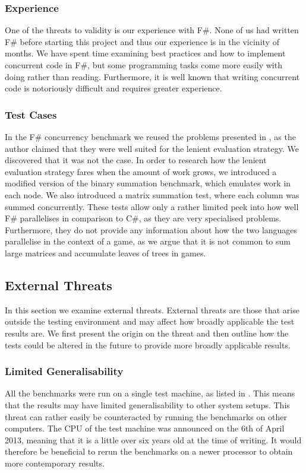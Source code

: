 \subsubsection{Experience}
One of the threats to validity is our experience with F\#. None of us had written F\# before starting this project and thus our experience is in the vicinity of months. We have spent time examining best practices and how to implement concurrent code in F\#, but some programming tasks come more easily with doing rather than reading. Furthermore, it is well known that writing concurrent code is notoriously difficult and requires greater experience\cite{nanz2013benchmarking,nanz2013examining}.

\subsubsection{Test Cases}
In the F\# concurrency benchmark we reused the problems presented in \cite{DBLP:journals/cl/Tremblay-parallel}, as the author claimed that they were well suited for the lenient evaluation strategy. We discovered that it was not the case. In order to research how the lenient evaluation strategy fares when the amount of work grows, we introduced a modified version of the binary summation benchmark, which emulates work in each node. We also introduced a matrix summation test, where each column was summed concurrently. These tests allow only a rather limited peek into how well F\# parallelises in comparison to C\#, as they are very specialised problems. Furthermore, they do not provide any information about how the two languages parallelise in the context of a game, as we argue that it is not common to sum large matrices and accumulate leaves of trees in games.

\subsection{External Threats}
In this section we examine external threats. External threats are those that arise outside the testing environment and may affect how broadly applicable the test results are. We first present the origin on the threat and then outline how the tests could be altered in the future to provide more broadly applicable results.

\subsubsection{Limited Generalisability}
All the benchmarks were run on a single test machine, as listed in . This means that the results may have limited generalisability to other system setups. This threat can rather easily be counteracted by running the benchmarks on other computers. The \gls{CPU} of the test machine was announced on the 6th of April 2013\cite{i7:specs}, meaning that it is a little over six years old at the time of writing. It would therefore be beneficial to rerun the benchmarks on a newer processor to obtain more contemporary results.
